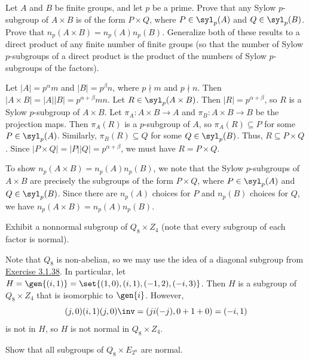 \begin{exercise}\label{ex5.1.4}
    Let $A$ and $B$ be finite groups, and let $p$ be a prime. Prove that any Sylow $p$-subgroup of $A \times B$ is of the form $P \times Q$, where $P \in \syl_p(A)$ and $Q \in \syl_p(B)$. Prove that $n_p(A \times B) = n_p(A)n_p(B)$. Generalize both of these results to a direct product of any finite number of finite groups (so that the number of Sylow $p$-subgroups of a direct product is the product of the numbers of Sylow $p$-subgroups of the factors).
\end{exercise}

\begin{sol}
    Let $|A| = p^\alpha m$ and $|B| = p^\beta n$, where $p \nmid m$ and $p \nmid n$. Then $|A \times B| = |A||B| = p^{\alpha + \beta}mn$. Let $R \in \syl_p(A \times B)$. Then $|R| = p^{\alpha + \beta}$, so $R$ is a Sylow $p$-subgroup of $A \times B$. Let $\pi_A : A \times B \to A$ and $\pi_B : A \times B \to B$ be the projection maps. Then $\pi_A(R)$ is a $p$-subgroup of $A$, so $\pi_A(R) \subseteq P$ for some $P \in \syl_p(A)$. Similarly, $\pi_B(R) \subseteq Q$ for some $Q \in \syl_p(B)$. Thus, $R \subseteq P \times Q$. Since $|P \times Q| = |P||Q| = p^{\alpha + \beta}$, we must have $R = P \times Q$.

    To show $n_p(A \times B) = n_p(A)n_p(B)$, we note that the Sylow $p$-subgroups of $A \times B$ are precisely the subgroups of the form $P \times Q$, where $P \in \syl_p(A)$ and $Q \in \syl_p(B)$. Since there are $n_p(A)$ choices for $P$ and $n_p(B)$ choices for $Q$, we have $n_p(A \times B) = n_p(A)n_p(B)$.
\end{sol}

\begin{exercise}\label{ex5.1.5}
    Exhibit a nonnormal subgroup of $Q_8 \times Z_4$ (note that every subgroup of each factor is normal).
\end{exercise}

\begin{sol}
    Note that $Q_8$ is non-abelian, so we may use the idea of a diagonal subgroup from \hyperref[ex3.1.38]{Exercise 3.1.38}. In particular, let $H = \gen{(i, 1)} = \set{(1, 0), (i, 1), (-1, 2), (-i, 3)}$. Then $H$ is a subgroup of $Q_8 \times Z_4$ that is isomorphic to $\gen{i}$. However,
    \[(j, 0)(i, 1)(j, 0)\inv = (ji(-j), 0 + 1 + 0) = (-i, 1)\]
    is not in $H$, so $H$ is not normal in $Q_8 \times Z_4$.
\end{sol}

\begin{exercise}\label{ex5.1.6}
    Show that all subgroups of $Q_8 \times E_{2^n}$ are normal.
\end{exercise}


